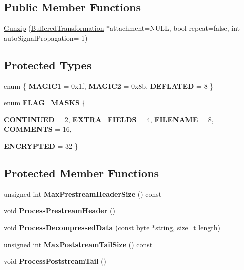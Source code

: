 \subsection*{Public Member Functions}
\begin{DoxyCompactItemize}
\item 
\hyperlink{class_gunzip_a30ad6514a475206a6b60ccf81693323b}{Gunzip} (\hyperlink{class_buffered_transformation}{BufferedTransformation} $\ast$attachment=NULL, bool repeat=false, int autoSignalPropagation=-\/1)
\end{DoxyCompactItemize}
\subsection*{Protected Types}
\begin{DoxyCompactItemize}
\item 
enum \{ {\bfseries MAGIC1} = 0x1f, 
{\bfseries MAGIC2} = 0x8b, 
{\bfseries DEFLATED} = 8
 \}
\item 
enum {\bfseries FLAG\_\-MASKS} \{ \par
{\bfseries CONTINUED} = 2, 
{\bfseries EXTRA\_\-FIELDS} = 4, 
{\bfseries FILENAME} = 8, 
{\bfseries COMMENTS} = 16, 
\par
{\bfseries ENCRYPTED} = 32
 \}
\end{DoxyCompactItemize}
\subsection*{Protected Member Functions}
\begin{DoxyCompactItemize}
\item 
\hypertarget{class_gunzip_aac577dbe2ff623c8b96863e8f0e5e042}{
unsigned int {\bfseries MaxPrestreamHeaderSize} () const }
\label{class_gunzip_aac577dbe2ff623c8b96863e8f0e5e042}

\item 
\hypertarget{class_gunzip_a698e33204628059569f5206bc48874d7}{
void {\bfseries ProcessPrestreamHeader} ()}
\label{class_gunzip_a698e33204628059569f5206bc48874d7}

\item 
\hypertarget{class_gunzip_a360055a74a55ba685743c0a1d3fefe3e}{
void {\bfseries ProcessDecompressedData} (const byte $\ast$string, size\_\-t length)}
\label{class_gunzip_a360055a74a55ba685743c0a1d3fefe3e}

\item 
\hypertarget{class_gunzip_afc657541a7939845afb5c381c2c5018a}{
unsigned int {\bfseries MaxPoststreamTailSize} () const }
\label{class_gunzip_afc657541a7939845afb5c381c2c5018a}

\item 
\hypertarget{class_gunzip_abf4c4fa9c6ed7bfffe5cbe27822efd2e}{
void {\bfseries ProcessPoststreamTail} ()}
\label{class_gunzip_abf4c4fa9c6ed7bfffe5cbe27822efd2e}

\end{DoxyCompactItemize}
